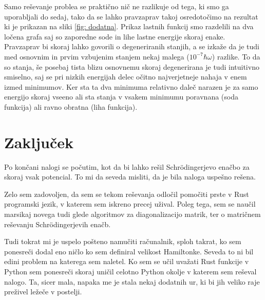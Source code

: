 \documentclass[slovene,11pt,a4paper]{article}
\begin{document}
Samo reševanje problea se praktično nič ne razlikuje od tega, ki smo ga uporabljali do sedaj, tako da se lahko pravzaprav takoj osredotočimo na rezultat ki je prikazan na sliki \ref{fig: dodatna}. Prikaz lastnih funkcij smo razdelili na dva ločena grafa saj so zaporedne sode in lihe lastne energije skoraj enake. Pravzaprav bi skoraj lahko govorili o degeneriranih stanjih, a se izkaže da je tudi med osnovnim in prvim vzbujenim stanjem nekaj malega ($10^{-7}\hbar \omega$) razlike. To da so stanja, še posebaj tista blizu osnovnemu skoraj degenerirana je tudi intuitivno smiselno, saj se pri nizkih energijah delec očitno najverjetneje nahaja v enem izmed minimumov. Ker sta ta dva minimuma relativno daleč narazen je za samo energijo skoraj vseeno ali sta stanja v vsakem minimumu poravnana (soda funkcija) ali ravno obratna (liha funkcija).

\section{Zaključek}

Po končani nalogi se počutim, kot da bi lahko rešil Schr\"odingerjevo enačbo za skoraj vsak potencial. To mi da seveda misliti, da je bila naloga uspešno rešena.

Zelo sem zadovoljen, da sem se tekom reševanja odločil pomočiti prste v Rust programski jezik, v katerem sem iskreno precej užival. Poleg tega, sem se naučil marsikaj novega tudi glede algoritmov za diagonalizacijo matrik, ter o matričnem reševanju Schr\"odingerjevih enačb.

Tudi tokrat mi je uspelo pošteno namučiti računalnik, sploh takrat, ko sem ponesreči dodal eno ničlo ko sem definiral velikost Hamiltonke. Seveda to ni bil edini problem na katerega sem naletel. Ko sem se učil uvažati Rust funkcije v Python sem ponesreči skoraj uničil celotno Python okolje v katerem sem reševal nalogo. Ta, sicer mala, napaka me je stala nekaj dodatnih ur, ki bi jih veliko raje preživel ležeče v postelji.



% 
% 
\end{document}

